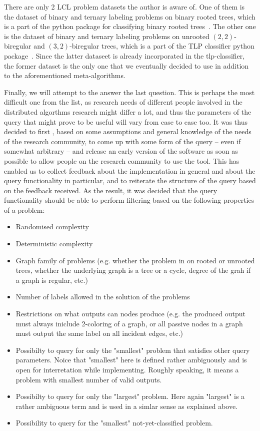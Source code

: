 There are only 2 LCL problem datasets the author is aware of. One of them is the dataset of binary and ternary labeling problems on binary rooted trees, which is a
part of the python package for classifying binary rooted trees~\cite{Tereshchenko2020brt}. The other one is the dataset of binary and ternary labeling problems on
unrooted $(2, 2)$-biregular and $(3, 2)$-biregular trees, which is a part of the TLP classifier python package~\cite{Rocher2020clas}. Since the latter dataseet is already incorporated in the tlp-classifier,
the former dataset is the only one that we eventually decided to use
in addition to the aforementioned meta-algorithms.

Finally, we will attempt to the answer the last question.
This is perhaps the most difficult one from the list,
as research needs of different people involved in 
the distributed algorthms research might differ a lot, and thus
the parameters of the query that might prove to be useful
will vary from case to case too. It was thus decided to first
, based on some assumptions and general knowledge of the
needs of the research community, to come up with some form of the
query -- even if somewhat arbitrary -- and release an early version
of the software as soon as possible to allow people on the
research community to use the tool. This has enabled us to
collect feedback about the implementation in general and about the
query functionality in particular, and to reiterate the structure of
the query based on the feedback received. As the result, it was
decided that the query functionality should be able to perform
filtering based on the following properties of a problem:

\begin{itemize}
  \item Randomised complexity
  \item Deterministic complexity
  \item Graph family of problems (e.g. whether the problem in on
  rooted or unrooted trees, whether the underlying graph is a tree
  or a cycle, degree of the grah if a graph is regular, etc.)
  \item Number of labels allowed in the solution of the problems
  \item Restrictions on what outputs can nodes produce (e.g. the
  produced output must always iniclude 2-coloring of a graph,
  or all passive nodes in a graph must output the same
  label on all incident edges, etc.)
  \item Possibilty to query for only the "smallest" problem that
  satisfies other query parameters. Noice that "smallest" here is
  defined rather ambiguously and is open for interretation while implementing. Roughly speaking, it means a problem with smallest
  number of valid outputs.
  \item Possibilty to query for only the "largest" problem. Here again
  "largest" is a rather ambiguous term and is used in a simlar sense
  as explained above.
  \item Possibility to query for the "smallest" not-yet-classified problem.
\end{itemize}
